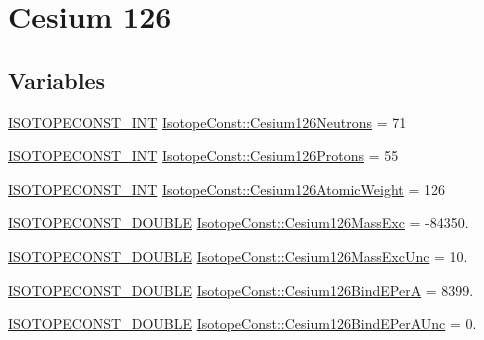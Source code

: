 \hypertarget{group___isotope_const-_cesium-_cs126}{}\section{Cesium 126}
\label{group___isotope_const-_cesium-_cs126}
\subsection*{Variables}
\begin{DoxyCompactItemize}
\item 
\mbox{\hyperlink{group___isotope_const-_macros_ga5f18360b3e99483a35c32d789e62621c}{I\+S\+O\+T\+O\+P\+E\+C\+O\+N\+S\+T\+\_\+\+I\+NT}} \mbox{\hyperlink{group___isotope_const-_cesium-_cs126_ga5fc24188137bc8f521acc01267594faa}{Isotope\+Const\+::\+Cesium126\+Neutrons}} = 71
\item 
\mbox{\hyperlink{group___isotope_const-_macros_ga5f18360b3e99483a35c32d789e62621c}{I\+S\+O\+T\+O\+P\+E\+C\+O\+N\+S\+T\+\_\+\+I\+NT}} \mbox{\hyperlink{group___isotope_const-_cesium-_cs126_ga1f24328dda3fca70eee88e8f9421beb1}{Isotope\+Const\+::\+Cesium126\+Protons}} = 55
\item 
\mbox{\hyperlink{group___isotope_const-_macros_ga5f18360b3e99483a35c32d789e62621c}{I\+S\+O\+T\+O\+P\+E\+C\+O\+N\+S\+T\+\_\+\+I\+NT}} \mbox{\hyperlink{group___isotope_const-_cesium-_cs126_gaff73133257912e7b26df0030bf9bfcc8}{Isotope\+Const\+::\+Cesium126\+Atomic\+Weight}} = 126
\item 
\mbox{\hyperlink{group___isotope_const-_macros_ga8f45a7272ce02c0b4c65c44636ed719a}{I\+S\+O\+T\+O\+P\+E\+C\+O\+N\+S\+T\+\_\+\+D\+O\+U\+B\+LE}} \mbox{\hyperlink{group___isotope_const-_cesium-_cs126_ga39f647b10b0d456e15a43fba09a08b17}{Isotope\+Const\+::\+Cesium126\+Mass\+Exc}} = -\/84350.
\item 
\mbox{\hyperlink{group___isotope_const-_macros_ga8f45a7272ce02c0b4c65c44636ed719a}{I\+S\+O\+T\+O\+P\+E\+C\+O\+N\+S\+T\+\_\+\+D\+O\+U\+B\+LE}} \mbox{\hyperlink{group___isotope_const-_cesium-_cs126_ga730de9a376f321fede8f138c799ed109}{Isotope\+Const\+::\+Cesium126\+Mass\+Exc\+Unc}} = 10.
\item 
\mbox{\hyperlink{group___isotope_const-_macros_ga8f45a7272ce02c0b4c65c44636ed719a}{I\+S\+O\+T\+O\+P\+E\+C\+O\+N\+S\+T\+\_\+\+D\+O\+U\+B\+LE}} \mbox{\hyperlink{group___isotope_const-_cesium-_cs126_ga172389d0fc5d16458b7176309f8043e6}{Isotope\+Const\+::\+Cesium126\+Bind\+E\+PerA}} = 8399.
\item 
\mbox{\hyperlink{group___isotope_const-_macros_ga8f45a7272ce02c0b4c65c44636ed719a}{I\+S\+O\+T\+O\+P\+E\+C\+O\+N\+S\+T\+\_\+\+D\+O\+U\+B\+LE}} \mbox{\hyperlink{group___isotope_const-_cesium-_cs126_gaafe9ff2900f77aa60a617c15ec8b4d15}{Isotope\+Const\+::\+Cesium126\+Bind\+E\+Per\+A\+Unc}} = 0.

\end{DoxyCompactItemize}
